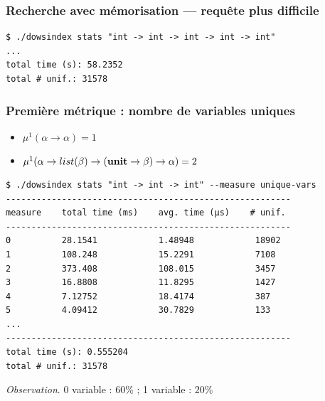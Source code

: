 \documentclass[serif]{beamer}
\newcommand{\unit}{\bold{unit}}
\begin{document}

\begin{frame}[fragile=singleslide]\frametitle{Recherche avec mémorisation — requête plus difficile}
\begin{verbatim}
$ ./dowsindex stats "int -> int -> int -> int -> int"
...
total time (s): 58.2352
total # unif.: 31578
\end{verbatim}
\end{frame}


\begin{frame}[fragile=singleslide]\frametitle{Première métrique : nombre de variables uniques}
\scriptsize
\begin{itemize}
	\item $\mu^1 (\alpha \rightarrow \alpha) = 1$
	\item $\mu^1 (\alpha \rightarrow list (\beta) \rightarrow (\unit \rightarrow \beta) \rightarrow \alpha) = 2$
\end{itemize}
\begin{verbatim}
$ ./dowsindex stats "int -> int -> int" --measure unique-vars
--------------------------------------------------------
measure    total time (ms)    avg. time (µs)    # unif.
--------------------------------------------------------
0          28.1541            1.48948            18902
1          108.248            15.2291            7108
2          373.408            108.015            3457
3          16.8808            11.8295            1427
4          7.12752            18.4174            387
5          4.09412            30.7829            133
...
--------------------------------------------------------
total time (s): 0.555204
total # unif.: 31578
\end{verbatim}
\textit{Observation}. 0 variable : 60\% ; 1 variable : 20\%
\end{frame}

\end{document}
